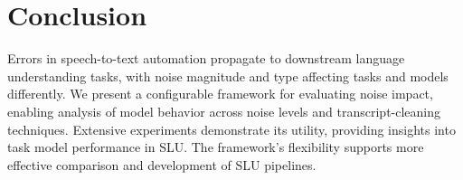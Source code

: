 \section{Conclusion}
\label{sec_conclusion}

Errors in speech-to-text automation propagate to downstream language understanding tasks, with noise magnitude and type affecting tasks and models differently. We present a configurable framework for evaluating noise impact, enabling analysis of model behavior across noise levels and transcript-cleaning techniques. Extensive experiments demonstrate its utility, providing insights into task model performance in SLU. The framework’s flexibility supports more effective comparison and development of SLU pipelines.

